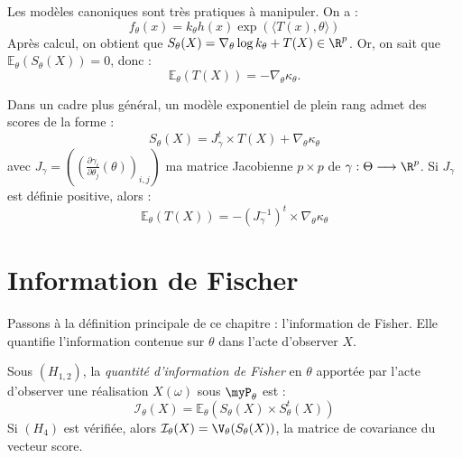 \begin{proposition}
    Les modèles canoniques sont très pratiques à manipuler. On a :  
        $$ f_\theta(x) = k_\theta h(x) \exp \left( \langle T(x), \theta \rangle\right) $$ 
    Après calcul, on obtient que $S_\theta(X) = \nabla_\theta \log k_\theta + T(X) \in \R^p$. 
    Or, on sait que $ \mathbb{E}_\theta(S_\theta(X)) = 0$, donc : 
        $$ \mathbb{E}_\theta(T(X)) = - \nabla_\theta \kappa_\theta. $$
\end{proposition}

\begin{prop}
    Dans un cadre plus général, un modèle exponentiel de plein rang admet des scores de la forme : 
        $$ S_\theta(X) = J_{ \gamma}^t \times T(X) + \nabla_\theta \kappa_\theta $$ 
    avec $ \displaystyle J_{\gamma} = \left( \left( \frac{\partial \gamma_i}{ \partial \theta_j} (\theta)\right)_{i,j}\right)$ 
    ma matrice Jacobienne $ p \times p$ de $ \gamma : \Theta \longrightarrow \R^p$. 
    Si $J_{\gamma}$ est définie positive, alors : 
        $$ \mathbb{E}_\theta(T(X)) = - \left( J_\gamma ^{-1}\right)^t \times \nabla_\theta \kappa_\theta $$
\end{prop}


\section{Information de Fischer}

Passons à la définition principale de ce chapitre : l'information de Fisher. Elle quantifie 
l'information contenue sur $ \theta$ dans l'acte d'observer $X$. 

\begin{definition}
    Sous $(H_{1,2})$, la \emph{quantité d'information de Fisher} en $ \theta$ apportée par l'acte d'observer 
    une réalisation $X( \omega)$ sous $ \myP_\theta$ est : 
    \begin{equation}
        \mathcal{I}_\theta(X) = \mathbb{E}_\theta(S_\theta(X) \times S_\theta^t(X))
    \end{equation}
    Si $(H_4)$ est vérifiée, alors $ \mathcal{I}_\theta(X) = \V_\theta(S_\theta(X))$, la 
    matrice de covariance du vecteur score. 
\end{definition}

